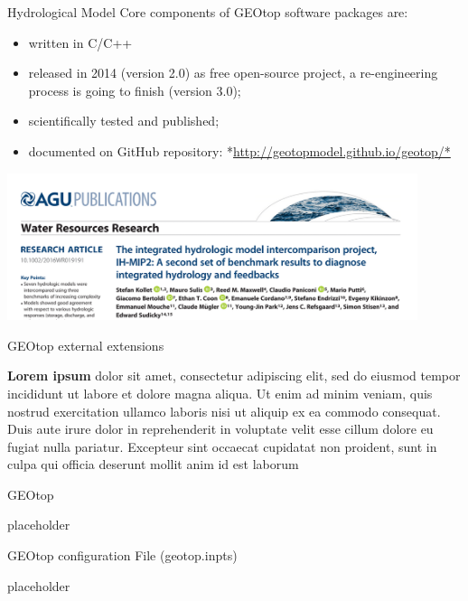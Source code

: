 \documentclass[ignorenonframetext,]{beamer}
\providecommand{\tightlist}{%
  \setlength{\itemsep}{0pt}\setlength{\parskip}{0pt}}
\begin{document}
\begin{frame}{Hydrological Model}
Core components of GEOtop software packages are:

\begin{itemize}
\tightlist
\item
  written in C/C++
\item
  released in 2014 (version 2.0) as free open-source project, a
  re-engineering process is going to finish (version 3.0);
\item
  scientifically tested and published;
\item
  documented on GitHub repository:
  *\url{http://geotopmodel.github.io/geotop/*}
\end{itemize}

\includegraphics[width=0.90000\textwidth]{resources/images/geotop_paper_2017.png}

\end{frame}

\begin{frame}{GEOtop external extensions}

\textbf{Lorem ipsum} dolor sit amet, consectetur adipiscing elit, sed do
eiusmod tempor incididunt ut labore et dolore magna aliqua. Ut enim ad
minim veniam, quis nostrud exercitation ullamco laboris nisi ut aliquip
ex ea commodo consequat. Duis aute irure dolor in reprehenderit in
voluptate velit esse cillum dolore eu fugiat nulla pariatur. Excepteur
sint occaecat cupidatat non proident, sunt in culpa qui officia deserunt
mollit anim id est laborum

\end{frame}

\begin{frame}{GEOtop}

placeholder

\end{frame}

\begin{frame}{GEOtop configuration File (geotop.inpts)}

placeholder

\end{frame}
\end{document}
